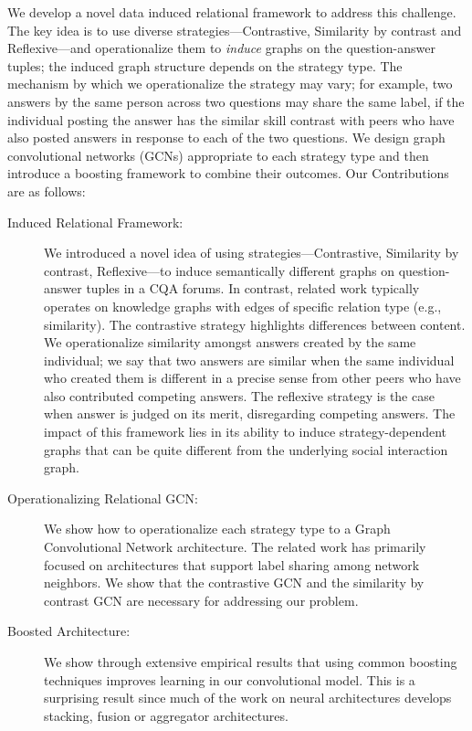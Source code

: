 We develop a novel data induced relational framework to address this challenge. The key idea is to use diverse strategies---Contrastive, Similarity by contrast and Reflexive---and operationalize them to \textit{induce} graphs on the question-answer tuples; the induced graph structure depends on the strategy type. The mechanism by which we operationalize the strategy may vary; for example, two answers by the same person across two questions may share the same label, if the individual posting the answer has the similar skill contrast with peers who have also posted answers in response to each of the two questions. We design graph convolutional networks (GCNs) appropriate to each strategy type and then introduce a boosting framework to combine their outcomes. Our Contributions are as follows:
\begin{description}
\item[Induced Relational Framework:] We introduced a novel idea of using strategies---Contrastive, Similarity by contrast, Reflexive---to induce semantically different graphs on question-answer tuples in a CQA forums. In contrast, related work typically operates on knowledge graphs with edges of specific relation type (e.g., similarity). The contrastive strategy highlights differences between content. We operationalize similarity amongst answers created by the same individual; we say that two answers are similar when the same individual who created them is different in a precise sense from other peers who have also contributed competing answers. The reflexive strategy is the case when answer is judged on its merit, disregarding competing answers. The impact of this framework lies in its ability to induce strategy-dependent graphs that can be quite different from the underlying social interaction graph.
  \item[Operationalizing Relational GCN:] We show how to operationalize each strategy type to a Graph Convolutional Network architecture. The related work has primarily focused on architectures that support label sharing among network neighbors. We show that the contrastive GCN and the similarity by contrast GCN are necessary for addressing our problem.
  \item[Boosted Architecture:]  We show through extensive empirical results that using common boosting techniques improves learning in our convolutional model. This is a surprising result since much of the work on neural architectures develops stacking, fusion or aggregator architectures.
\end{description}

